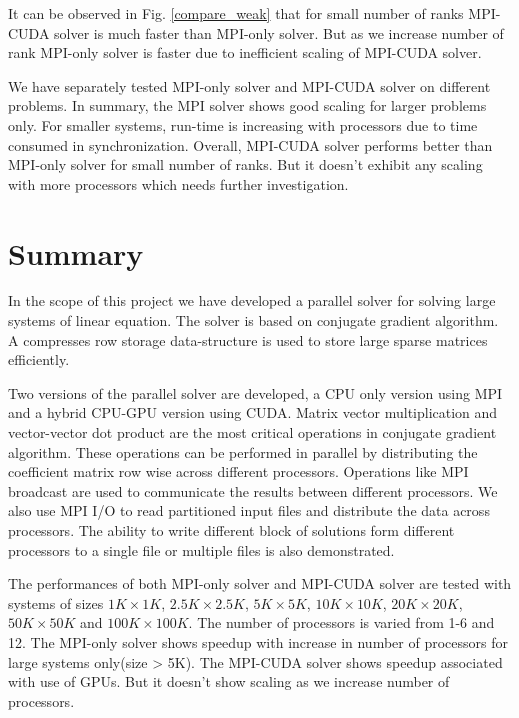 \documentclass[sigplan,screen]{acmart}
\begin{document}
It can be observed in Fig. \ref{compare_weak} that for small number of ranks MPI-CUDA solver is much faster than MPI-only solver. But as we increase number of rank MPI-only solver is faster due to inefficient scaling of MPI-CUDA solver. 

We have separately tested MPI-only solver and MPI-CUDA solver on different problems. In summary, the MPI solver shows good scaling for larger problems only. For smaller systems, run-time is increasing with processors due to time consumed in synchronization. Overall, MPI-CUDA solver performs better than MPI-only solver for small number of ranks. But it doesn't exhibit any scaling with more processors which needs further investigation. 

\section{Summary}
In the scope of this project we have developed a parallel solver for solving large systems of linear equation. The solver is based on conjugate gradient algorithm. A compresses row storage data-structure is used to store large sparse matrices efficiently. 

Two versions of the parallel solver are developed, a CPU only version using MPI and a hybrid CPU-GPU version using CUDA. Matrix vector multiplication and vector-vector dot product are the most critical operations in conjugate gradient algorithm. These operations can be performed in parallel by distributing the coefficient matrix row wise across different processors. Operations like MPI broadcast are used to communicate the results between different processors. We also use MPI I/O to read partitioned input files and distribute the data across processors. The ability to write different block of solutions form different processors to a single file or multiple files is also demonstrated. 

The performances of both MPI-only solver and MPI-CUDA solver are tested with systems of sizes $1K\times 1K$, $2.5K\times 2.5K$, $5K\times 5K$, $10K\times 10K$, $20K\times 20K$, $50K\times 50K$ and $100K\times 100K$. The number of processors is varied from 1-6 and 12. The MPI-only solver shows speedup with increase in number of processors for  large systems only(size > 5K). The MPI-CUDA solver shows speedup associated with use of GPUs. But it doesn't show scaling as we increase number of processors. 
\end{document}
